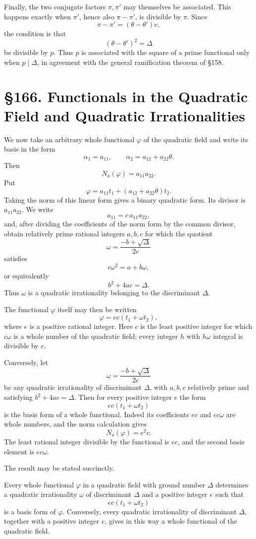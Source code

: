 \documentclass[12pt,a4paper]{article}
\newcommand{\webersection}[2]{\clearpage\section*{\S #1. #2}}
\begin{document}
Finally, the two conjugate factors \(\pi,\pi'\) may themselves be associated.  This happens exactly when \(\pi'\), hence also \(\pi-\pi'\), is divisible by \(\pi\).  Since
\[
  \pi-\pi'=(\theta-\theta')v,
\]
the condition is that
\[
  (\theta-\theta')^2=\Delta
\]
be divisible by \(p\).  Thus \(p\) is associated with the square of a prime functional only when \(p\mid\Delta\), in agreement with the general ramification theorem of \S158.

\webersection{166}{Functionals in the Quadratic Field and Quadratic Irrationalities}

We now take an arbitrary whole functional \(\varphi\) of the quadratic field and write its basis in the form
\[
  \alpha_1=a_{11},\qquad
  \alpha_2=a_{12}+a_{22}\theta.
\tag{1}
\]
Then
\[
  N_a(\varphi)=a_{11}a_{22}.
\tag{2}
\]
Put
\[
  \varphi=a_{11}t_1+(a_{12}+a_{22}\theta)t_2.
\tag{3}
\]
Taking the norm of this linear form gives a binary quadratic form.  Its divisor is \(a_{11}a_{22}\).  We write
\[
  a_{11}=c\,a_{11}a_{22},
\]
and, after dividing the coefficients of the norm form by the common divisor, obtain relatively prime rational integers \(a,b,c\) for which the quotient
\[
  \omega=\frac{-b+\sqrt\Delta}{2c}
\tag{4}
\]
satisfies
\[
  c\omega^2=a+b\omega,
\tag{5}
\]
or equivalently
\[
  b^2+4ac=\Delta.
\tag{6}
\]
Thus \(\omega\) is a quadratic irrationality belonging to the discriminant \(\Delta\).

The functional \(\varphi\) itself may then be written
\[
  \varphi=ec(t_1+\omega t_2),
\tag{7}
\]
where \(e\) is a positive rational integer.  Here \(c\) is the least positive integer for which \(c\omega\) is a whole number of the quadratic field; every integer \(h\) with \(h\omega\) integral is divisible by \(c\).

Conversely, let
\[
  \omega=\frac{-b+\sqrt\Delta}{2c}
\]
be any quadratic irrationality of discriminant \(\Delta\), with \(a,b,c\) relatively prime and satisfying \(b^2+4ac=\Delta\).  Then for every positive integer \(e\) the form
\[
  ec(t_1+\omega t_2)
\tag{8}
\]
is the basis form of a whole functional.  Indeed its coefficients \(ec\) and \(ec\omega\) are whole numbers, and the norm calculation gives
\[
  N_a(\varphi)=e^2c.
\tag{9}
\]
The least rational integer divisible by the functional is \(ec\), and the second basis element is \(ec\omega\).

The result may be stated succinctly.

Every whole functional \(\varphi\) in a quadratic field with ground number \(\Delta\) determines a quadratic irrationality \(\omega\) of discriminant \(\Delta\) and a positive integer \(e\) such that
\[
  ec(t_1+\omega t_2)
\tag{10}
\]
is a basis form of \(\varphi\).  Conversely, every quadratic irrationality of discriminant \(\Delta\), together with a positive integer \(e\), gives in this way a whole functional of the quadratic field.
\end{document}

